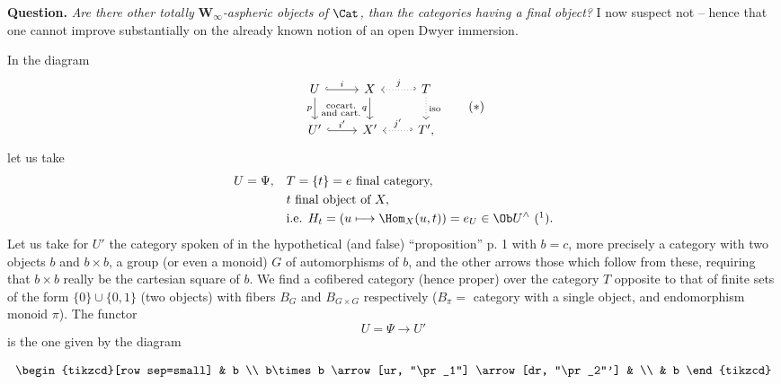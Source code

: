 
\textbf{Question.} \textit{Are there other totally} $\mathbf{W}_\infty$\textit{-aspheric objects of} $\Cat$\textit{, than the categories having a final object?} I now suspect not -- hence that one cannot improve substantially on the already known notion of an open Dwyer immersion.

In the diagram
\[
\begin{tikzcd}
U \arrow[r, hook, "i"] \arrow[d, "p"'] \arrow[dr, phantom, "\substack{\text{cocart.}\\ \text{and cart.}}"] & X \arrow[d, "q"'] & T \arrow[l, hook', dotted, "j"'] \arrow[d, dotted, "\text{iso}"] \\
U' \arrow[r, hook, "i'"] & X' & T', \arrow[l, hook', dotted, "j'"']
\end{tikzcd}
\tag*{$(*)$}
\]
let us take
\[
\begin{aligned}
U = \Psi, \quad & T = \{t\} = e \text{ final category,}\\
& t \text{ final object of } X,\\
& \text{i.e. } H_t = (u\longmapsto \Hom_X(u,t)) = e_U \in \Ob U^\wedge \ \mbox{(\footnotemark)}.
\end{aligned}
\]
Let us take for $U'$ the category spoken of in the hypothetical (and false) ``proposition'' p. 1 with $b = c$, more precisely a category with two objects $b$ and $b\times b$, a group (or even a monoid) $G$ of automorphisms of $b$, and the other arrows those which follow from these, requiring that $b\times b$ really be the cartesian square of $b$. We find a cofibered category (hence proper) over the category $T$ opposite to that of finite sets of the form $\{0\}\cup\{0,1\}$ (two objects) with fibers $B_G$ and $B_{G\times G}$ respectively ($B_\pi =$ category with a single object, and endomorphism monoid $\pi$). The functor
\[
U = \Psi \longrightarrow U'
\]
is the one given by the diagram

\[
\begin{tikzcd}[row sep=small]
& b \\
b\times b \arrow[ur, "\pr_1"] \arrow[dr, "\pr_2"'] & \\
& b
\end{tikzcd}
\]